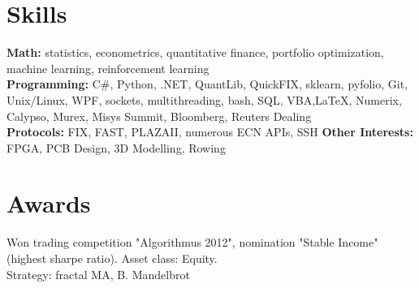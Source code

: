 \documentclass[a4paper,hidelinks]{article}
\newcommand{\resumeSubHeadingListStart}{\begin{itemize}[leftmargin=0.15in, label={}]}
\newcommand{\resumeSubHeadingListEnd}{\end{itemize}}
\begin{document}
\section{Skills}
\resumeSubHeadingListStart
\small{\item{
              \textbf{{Math:}}{ statistics, econometrics, quantitative finance, portfolio optimization, machine learning, reinforcement learning\\} %
              \textbf{{Programming:}}{ C\#, Python, .NET, QuantLib, QuickFIX, sklearn, pyfolio, Git, Unix/Linux, WPF, sockets, multithreading, bash, SQL, VBA,\LaTeX, Numerix, Calypso, Murex, Misys Summit, Bloomberg, Reuters Dealing \\} %
              \textbf{{Protocols:}}{ FIX, FAST, PLAZAII, numerous ECN APIs, SSH } %
              \textbf{{Other Interests:}}{ FPGA, PCB Design, 3D Modelling, Rowing} %
        }}

\resumeSubHeadingListEnd
\vspace{-11pt}
\section{Awards}
\begin{description}%
  \item{Won trading competition "Algorithmus 2012", nomination "Stable Income" (highest sharpe ratio). Asset class: Equity.\\Strategy: fractal MA, B. Mandelbrot}  
\vspace{-5pt}
\end{description}
\end{document}
